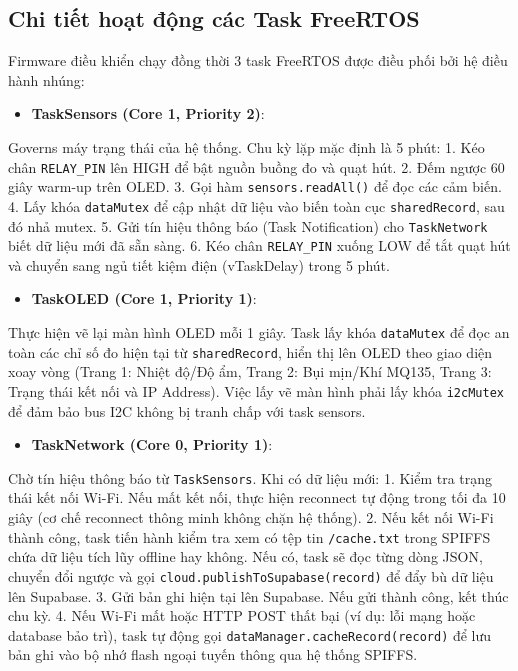 \subsection{Chi tiết hoạt động các Task FreeRTOS}
Firmware điều khiển chạy đồng thời 3 task FreeRTOS được điều phối bởi hệ điều hành nhúng:
\begin{itemize}
    \item \textbf{TaskSensors (Core 1, Priority 2)}: 
\end{itemize}
  Governs máy trạng thái của hệ thống. Chu kỳ lặp mặc định là 5 phút:
  1. Kéo chân \texttt{RELAY\_PIN} lên HIGH để bật nguồn buồng đo và quạt hút.
  2. Đếm ngược 60 giây warm-up trên OLED.
  3. Gọi hàm \texttt{sensors.readAll()} để đọc các cảm biến.
  4. Lấy khóa \texttt{dataMutex} để cập nhật dữ liệu vào biến toàn cục \texttt{sharedRecord}, sau đó nhả mutex.
  5. Gửi tín hiệu thông báo (Task Notification) cho \texttt{TaskNetwork} biết dữ liệu mới đã sẵn sàng.
  6. Kéo chân \texttt{RELAY\_PIN} xuống LOW để tắt quạt hút và chuyển sang ngủ tiết kiệm điện (vTaskDelay) trong 5 phút.
\begin{itemize}
    \item \textbf{TaskOLED (Core 1, Priority 1)}:
\end{itemize}
  Thực hiện vẽ lại màn hình OLED mỗi 1 giây. Task lấy khóa \texttt{dataMutex} để đọc an toàn các chỉ số đo hiện tại từ \texttt{sharedRecord}, hiển thị lên OLED theo giao diện xoay vòng (Trang 1: Nhiệt độ/Độ ẩm, Trang 2: Bụi mịn/Khí MQ135, Trang 3: Trạng thái kết nối và IP Address). Việc lấy vẽ màn hình phải lấy khóa \texttt{i2cMutex} để đảm bảo bus I2C không bị tranh chấp với task sensors.
\begin{itemize}
    \item \textbf{TaskNetwork (Core 0, Priority 1)}:
\end{itemize}
  Chờ tín hiệu thông báo từ \texttt{TaskSensors}. Khi có dữ liệu mới:
  1. Kiểm tra trạng thái kết nối Wi-Fi. Nếu mất kết nối, thực hiện reconnect tự động trong tối đa 10 giây (cơ chế reconnect thông minh không chặn hệ thống).
  2. Nếu kết nối Wi-Fi thành công, task tiến hành kiểm tra xem có tệp tin \texttt{/cache.txt} trong SPIFFS chứa dữ liệu tích lũy offline hay không. Nếu có, task sẽ đọc từng dòng JSON, chuyển đổi ngược và gọi \texttt{cloud.publishToSupabase(record)} để đẩy bù dữ liệu lên Supabase.
  3. Gửi bản ghi hiện tại lên Supabase. Nếu gửi thành công, kết thúc chu kỳ.
  4. Nếu Wi-Fi mất hoặc HTTP POST thất bại (ví dụ: lỗi mạng hoặc database bảo trì), task tự động gọi \texttt{dataManager.cacheRecord(record)} để lưu bản ghi vào bộ nhớ flash ngoại tuyến thông qua hệ thống SPIFFS.

